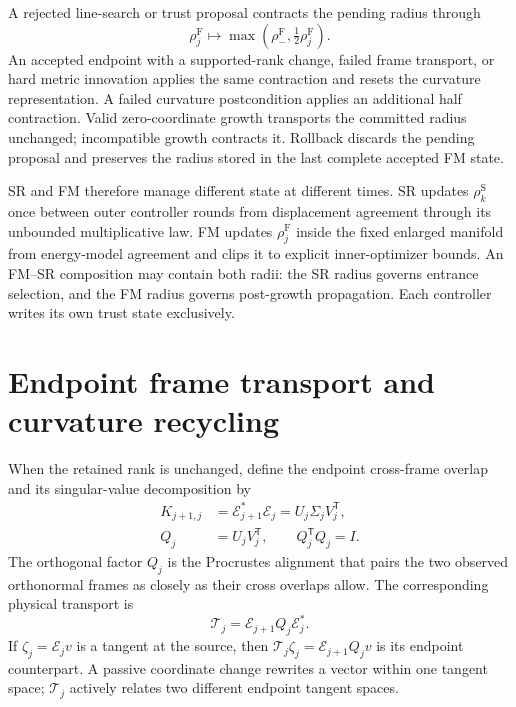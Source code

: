 \documentclass[10pt,twocolumn]{article}
\begin{document}
A rejected line-search or trust proposal contracts the pending radius through
\begin{equation}
\rho_j^{\mathrm F}\longmapsto
\max\!\left(\rho_-^{\mathrm F},\tfrac12\rho_j^{\mathrm F}\right).
\label{eq:fm-rejection-contraction}
\end{equation}
An accepted endpoint with a supported-rank change, failed frame transport, or
hard metric innovation applies the same contraction and resets the curvature
representation. A failed curvature postcondition applies an
additional half contraction. Valid zero-coordinate growth transports the
committed radius unchanged; incompatible growth contracts it. Rollback
discards the pending proposal and preserves the radius stored in the last
complete accepted FM state.

SR and FM therefore manage different state at different times. SR updates
\(\rho_k^{\mathrm S}\) once between outer controller rounds from displacement
agreement through its unbounded multiplicative law. FM updates
\(\rho_j^{\mathrm F}\) inside the fixed enlarged manifold from energy-model
agreement and clips it to explicit inner-optimizer bounds. An FM--SR
composition may contain both radii: the SR radius governs entrance selection,
and the FM radius governs post-growth propagation. Each controller writes its
own trust state exclusively.

\section*{Endpoint frame transport and curvature recycling}

When the retained rank is unchanged, define the endpoint cross-frame overlap
and its singular-value decomposition by
\begin{align}
K_{j+1,j}&=\mathcal E_{j+1}^*\mathcal E_j
=U_j\Sigma_jV_j^{\mathsf T},
\nonumber\\
Q_j&=U_jV_j^{\mathsf T},
\qquad Q_j^{\mathsf T}Q_j=I.
\label{eq:fm-procrustes}
\end{align}
The orthogonal factor \(Q_j\) is the Procrustes alignment that pairs the two
observed orthonormal frames as closely as their cross overlaps allow. The
corresponding physical transport is
\begin{equation}
\mathcal T_j
=\mathcal E_{j+1}Q_j\mathcal E_j^*.
\label{eq:fm-physical-transport}
\end{equation}
If \(\zeta_j=\mathcal E_jv\) is a tangent at the source, then
\(\mathcal T_j\zeta_j=\mathcal E_{j+1}Q_jv\) is its endpoint counterpart.
A passive coordinate change rewrites a vector within one tangent space;
\(\mathcal T_j\) actively relates two different endpoint tangent spaces.
\end{document}
